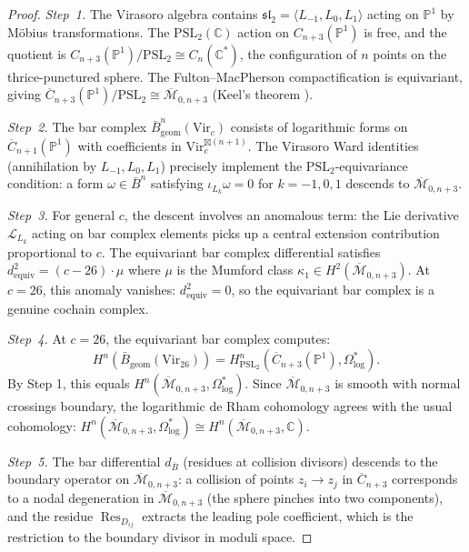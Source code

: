 \begin{proof}
\emph{Step~1.}
The Virasoro algebra contains $\mathfrak{sl}_2 = \langle L_{-1}, L_0, L_1 \rangle$ acting on $\mathbb{P}^1$ by Möbius transformations.  The $\mathrm{PSL}_2(\mathbb{C})$ action on $C_{n+3}(\mathbb{P}^1)$ is free, and the quotient is $C_{n+3}(\mathbb{P}^1)/\mathrm{PSL}_2 \cong C_n(\mathbb{C}^*)$, the configuration of $n$ points on the thrice-punctured sphere.  The Fulton--MacPherson compactification is equivariant, giving $\overline{C}_{n+3}(\mathbb{P}^1)/\mathrm{PSL}_2 \cong \overline{\mathcal{M}}_{0,n+3}$ (Keel's theorem \cite{Kee92}).

\emph{Step~2.}
The bar complex $\bar{B}^n_{\mathrm{geom}}(\mathrm{Vir}_c)$ consists of logarithmic forms on $\overline{C}_{n+1}(\mathbb{P}^1)$ with coefficients in $\mathrm{Vir}_c^{\boxtimes(n+1)}$.  The Virasoro Ward identities (annihilation by $L_{-1}, L_0, L_1$) precisely implement the $\mathrm{PSL}_2$-equivariance condition: a form $\omega \in \bar{B}^n$ satisfying $\iota_{L_k}\omega = 0$ for $k = -1, 0, 1$ descends to $\overline{\mathcal{M}}_{0,n+3}$.

\emph{Step~3.}
For general $c$, the descent involves an anomalous term: the Lie derivative $\mathcal{L}_{L_k}$ acting on bar complex elements picks up a central extension contribution proportional to $c$.  The equivariant bar complex differential satisfies $d_{\mathrm{equiv}}^2 = (c - 26) \cdot \mu$ where $\mu$ is the Mumford class $\kappa_1 \in H^2(\overline{\mathcal{M}}_{0,n+3})$.  At $c = 26$, this anomaly vanishes: $d_{\mathrm{equiv}}^2 = 0$, so the equivariant bar complex is a genuine cochain complex.

\emph{Step~4.}
At $c = 26$, the equivariant bar complex computes:
\[
H^n(\bar{B}_{\mathrm{geom}}(\mathrm{Vir}_{26})) = H^n_{\mathrm{PSL}_2}(\overline{C}_{n+3}(\mathbb{P}^1), \Omega^*_{\log}).
\]
By Step 1, this equals $H^n(\overline{\mathcal{M}}_{0,n+3}, \Omega^*_{\log})$.  Since $\overline{\mathcal{M}}_{0,n+3}$ is smooth with normal crossings boundary, the logarithmic de Rham cohomology agrees with the usual cohomology: $H^n(\overline{\mathcal{M}}_{0,n+3}, \Omega^*_{\log}) \cong H^n(\overline{\mathcal{M}}_{0,n+3}, \mathbb{C})$.

\emph{Step~5.}
The bar differential $d_{\bar{B}}$ (residues at collision divisors) descends to the boundary operator on $\overline{\mathcal{M}}_{0,n+3}$: a collision of points $z_i \to z_j$ in $\overline{C}_{n+3}$ corresponds to a nodal degeneration in $\overline{\mathcal{M}}_{0,n+3}$ (the sphere pinches into two components), and the residue $\operatorname{Res}_{D_{ij}}$ extracts the leading pole coefficient, which is the restriction to the boundary divisor in moduli space.
\end{proof}
 
